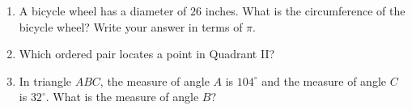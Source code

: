 \documentclass{article}
\begin{document}
\begin{enumerate}



\item A bicycle wheel has a diameter of $26$ inches. What is the circumference of the bicycle wheel? Write your answer in terms of $\pi$.

  \begin{enumerate}
  \end{enumerate}


\item Which ordered pair locates a point in Quadrant II?

  \begin{enumerate}
  \end{enumerate}


\item In triangle $ABC$, the measure of angle $A$ is $104^{\circ}$ and the measure of angle $C$ is $32^{\circ}$. What is the measure of angle $B$?

  \begin{enumerate}
  \end{enumerate}



\end{enumerate}
\end{document}
